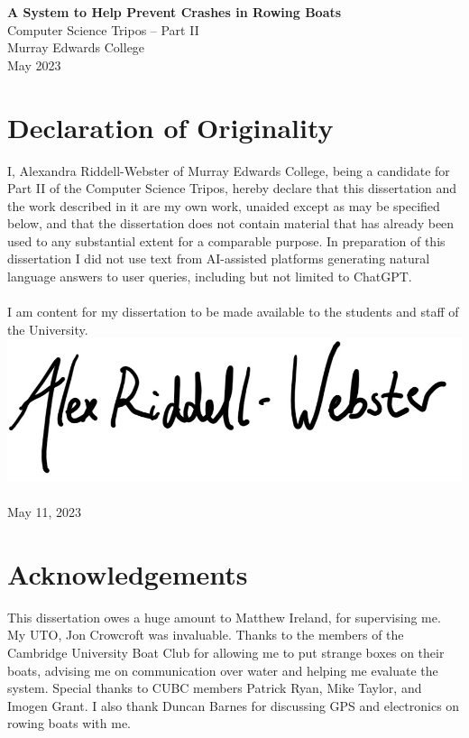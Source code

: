 \documentclass[12pt,a4paper]{report}
\begin{document}
\thispagestyle{empty}


\vspace*{60mm}
\begin{center}
\Huge
\textbf{A System to Help Prevent Crashes in Rowing Boats} \\[5mm]
Computer Science Tripos -- Part II \\[5mm]
Murray Edwards College \\[5mm]
May 2023
\end{center}

\pagestyle{plain}
\chapter*{Declaration of Originality}

I, Alexandra Riddell-Webster of Murray Edwards College, being a candidate for Part II of the Computer Science Tripos, hereby declare that this dissertation and the work described in it are my own work, unaided except as may be specified below, and that the dissertation does not contain material that has already been used to any substantial extent for a comparable purpose. In preparation of this dissertation I did not use text from AI-assisted platforms generating natural language answers to user queries, including but not limited to ChatGPT.\\ \\
I am content for my dissertation to be made available to the students and staff of the University. \\

\bigskip
{}
\includegraphics[scale=0.35]{sig.jpg} \\
 \\ 
May 11, 2023

\chapter*{Acknowledgements}
This dissertation owes a huge amount to Matthew Ireland, for supervising me. My UTO, Jon Crowcroft was invaluable. Thanks to the members of the Cambridge University Boat Club for allowing me to put strange boxes on their boats, advising me on communication over water and helping me evaluate the system. Special thanks to CUBC members Patrick Ryan, Mike Taylor, and Imogen Grant. I also thank Duncan Barnes for discussing GPS and electronics on rowing boats with me.
\end{document}
